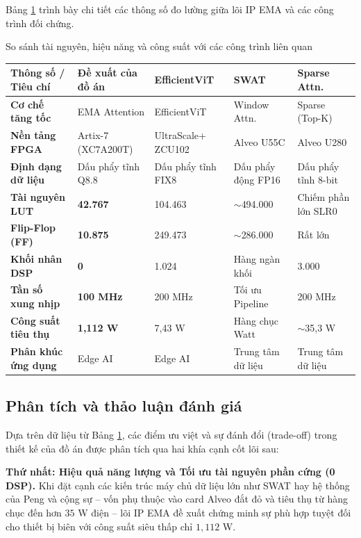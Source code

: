 \documentclass{uetgraduation}
\begin{document}
Bảng \ref{tab:so_sanh_tong_hop} trình bày chi tiết các thông số đo lường giữa lõi IP EMA và các công trình đối chứng.
\begin{table}[h]{So sánh tài nguyên, hiệu năng và công suất với các công trình liên quan}
\centering
\label{tab:so_sanh_tong_hop}
\renewcommand{\arraystretch}{1.3}
\footnotesize
\begin{tabular}{|p{2.6cm}|p{2.8cm}|p{3cm}|p{3cm}|p{3cm}|}
\hline
\textbf{Thông số / Tiêu chí} & \textbf{Đề xuất của đồ án} & \textbf{EfficientViT \cite{efficientvit_acc}} & \textbf{SWAT \cite{swat_acc}} & \textbf{Sparse Attn. \cite{peng2022_sparse}} \\ \hline
\textbf{Cơ chế tăng tốc} & EMA Attention & EfficientViT & Window Attn. & Sparse (Top-K) \\ \hline
\textbf{Nền tảng FPGA} & Artix-7 (XC7A200T) & UltraScale+ ZCU102 & Alveo U55C & Alveo U280 \\ \hline
\textbf{Định dạng dữ liệu} & Dấu phẩy tĩnh Q8.8 & Dấu phẩy tĩnh FIX8 & Dấu phẩy động FP16 & Dấu phẩy tĩnh 8-bit \\ \hline
\textbf{Tài nguyên LUT} & \textbf{42.767} & 104.463 & $\sim$494.000 & Chiếm phần lớn SLR0 \\ \hline
\textbf{Flip-Flop (FF)} & \textbf{10.875} & 249.473 & $\sim$286.000 & Rất lớn \\ \hline
\textbf{Khối nhân DSP} & \textbf{0} & 1.024 & Hàng ngàn khối & 3.000 \\ \hline
\textbf{Tần số xung nhịp} & \textbf{100 MHz} & 200 MHz & Tối ưu Pipeline & 200 MHz \\ \hline
\textbf{Công suất tiêu thụ} & \textbf{1,112 W} & 7,43 W & Hàng chục Watt & $\sim$35,3 W \\ \hline
\textbf{Phân khúc ứng dụng} & Edge AI & Edge AI & Trung tâm dữ liệu & Trung tâm dữ liệu \\ \hline
\end{tabular}
\end{table}

\subsection{Phân tích và thảo luận đánh giá}

Dựa trên dữ liệu từ Bảng \ref{tab:so_sanh_tong_hop}, các điểm ưu việt và sự đánh đổi (trade-off) trong thiết kế của đồ án được phân tích qua hai khía cạnh cốt lõi sau:

\textbf{Thứ nhất: Hiệu quả năng lượng và Tối ưu tài nguyên phần cứng (0 DSP).} 
Khi đặt cạnh các kiến trúc máy chủ dữ liệu lớn như SWAT \cite{swat_acc} hay hệ thống của Peng và cộng sự \cite{peng2022_sparse} – vốn phụ thuộc vào card Alveo đắt đỏ và tiêu thụ từ hàng chục đến hơn $35$ W điện – lõi IP EMA đề xuất chứng minh sự phù hợp tuyệt đối cho thiết bị biên với công suất siêu thấp chỉ $1,112$ W. 
\end{document}
